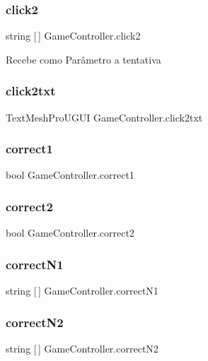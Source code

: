 \subsubsection{click2}
{\footnotesize\ttfamily string [$\,$] Game\+Controller.\+click2}

Recebe como Parâmetro a tentativa \mbox{\label{class_game_controller_ae0595f1f7702d83181d71b9284a9a93d}} 
\subsubsection{click2txt}
{\footnotesize\ttfamily Text\+Mesh\+Pro\+U\+G\+UI Game\+Controller.\+click2txt}

\mbox{\label{class_game_controller_a803c2b94557f1c8f94d148d42e4777a3}} 
\subsubsection{correct1}
{\footnotesize\ttfamily bool Game\+Controller.\+correct1}

\mbox{\label{class_game_controller_a2e7370fb1ce7b2e6f0b4e1fb5bb1e1b2}} 
\subsubsection{correct2}
{\footnotesize\ttfamily bool Game\+Controller.\+correct2}

\mbox{\label{class_game_controller_a6e882335c228556dd34004793f71b569}} 
\subsubsection{correctN1}
{\footnotesize\ttfamily string [$\,$] Game\+Controller.\+correct\+N1}

\mbox{\label{class_game_controller_ae8124c0525a9eae9f28dc6f36efabce0}} 
\subsubsection{correctN2}
{\footnotesize\ttfamily string [$\,$] Game\+Controller.\+correct\+N2}

